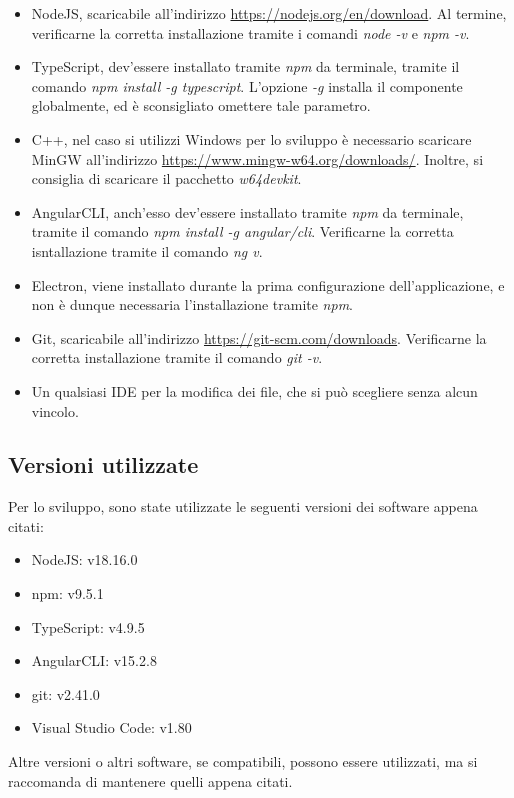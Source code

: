 \begin{itemize}
    \item NodeJS, scaricabile all'indirizzo \href{https://nodejs.org/en/download}{https://nodejs.org/en/download}. Al termine, verificarne la corretta installazione tramite i comandi \textit{node -v} e \textit{npm -v}.
    \item TypeScript, dev'essere installato tramite \textit{npm} da terminale, tramite il comando \textit{npm install -g typescript}. L'opzione \textit{-g} installa il componente globalmente, ed è sconsigliato omettere tale parametro.
    \item C++, nel caso si utilizzi Windows per lo sviluppo è necessario scaricare MinGW all'indirizzo \href{https://www.mingw-w64.org/downloads/}{https://www.mingw-w64.org/downloads/}. Inoltre, si consiglia di scaricare il pacchetto \textit{w64devkit}.
    \item AngularCLI, anch'esso dev'essere installato tramite \textit{npm} da terminale, tramite il comando \textit{npm install -g angular/cli}. Verificarne la corretta isntallazione tramite il comando \textit{ng v}.
    \item Electron, viene installato durante la prima configurazione dell'applicazione, e non è dunque necessaria l'installazione tramite \textit{npm}.
    \item Git, scaricabile all'indirizzo \href{https://git-scm.com/downloads}{https://git-scm.com/downloads}. Verificarne la corretta installazione tramite il comando \textit{git -v}.
    \item Un qualsiasi IDE per la modifica dei file, che si può scegliere senza alcun vincolo.
\end{itemize}

\subsection{Versioni utilizzate}
Per lo sviluppo, sono state utilizzate le seguenti versioni dei software appena citati:
\begin{itemize}
    \item NodeJS: v18.16.0
    \item npm: v9.5.1
    \item TypeScript: v4.9.5
    \item AngularCLI: v15.2.8
    \item git: v2.41.0
    \item Visual Studio Code: v1.80
\end{itemize}
Altre versioni o altri software, se compatibili, possono essere utilizzati, ma si raccomanda di mantenere quelli appena citati.

